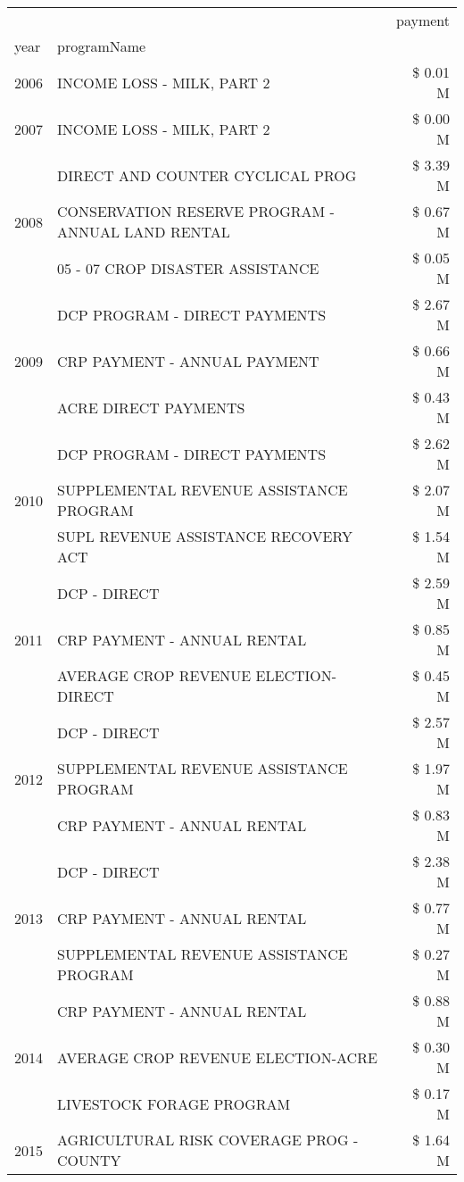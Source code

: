 \begin{tabular}{llr}
\toprule
 &  & payment \\
year & programName &  \\
\midrule
2006 & INCOME LOSS - MILK, PART 2 & \$ 0.01 M \\
\cline{1-3}
2007 & INCOME LOSS - MILK, PART 2 & \$ 0.00 M \\
\cline{1-3}
\multirow[t]{3}{*}{2008} & DIRECT AND COUNTER CYCLICAL PROG & \$ 3.39 M \\
 & CONSERVATION RESERVE PROGRAM - ANNUAL LAND RENTAL & \$ 0.67 M \\
 & 05 - 07 CROP DISASTER ASSISTANCE & \$ 0.05 M \\
\cline{1-3}
\multirow[t]{3}{*}{2009} & DCP PROGRAM - DIRECT PAYMENTS & \$ 2.67 M \\
 & CRP PAYMENT - ANNUAL PAYMENT & \$ 0.66 M \\
 & ACRE DIRECT PAYMENTS & \$ 0.43 M \\
\cline{1-3}
\multirow[t]{3}{*}{2010} & DCP PROGRAM - DIRECT PAYMENTS & \$ 2.62 M \\
 & SUPPLEMENTAL REVENUE ASSISTANCE PROGRAM & \$ 2.07 M \\
 & SUPL REVENUE ASSISTANCE RECOVERY ACT & \$ 1.54 M \\
\cline{1-3}
\multirow[t]{3}{*}{2011} & DCP - DIRECT & \$ 2.59 M \\
 & CRP PAYMENT - ANNUAL RENTAL & \$ 0.85 M \\
 & AVERAGE CROP REVENUE ELECTION-DIRECT & \$ 0.45 M \\
\cline{1-3}
\multirow[t]{3}{*}{2012} & DCP - DIRECT & \$ 2.57 M \\
 & SUPPLEMENTAL REVENUE ASSISTANCE PROGRAM & \$ 1.97 M \\
 & CRP PAYMENT - ANNUAL RENTAL & \$ 0.83 M \\
\cline{1-3}
\multirow[t]{3}{*}{2013} & DCP - DIRECT & \$ 2.38 M \\
 & CRP PAYMENT - ANNUAL RENTAL & \$ 0.77 M \\
 & SUPPLEMENTAL REVENUE ASSISTANCE PROGRAM & \$ 0.27 M \\
\cline{1-3}
\multirow[t]{3}{*}{2014} & CRP PAYMENT - ANNUAL RENTAL & \$ 0.88 M \\
 & AVERAGE CROP REVENUE ELECTION-ACRE & \$ 0.30 M \\
 & LIVESTOCK FORAGE PROGRAM & \$ 0.17 M \\
\cline{1-3}
\multirow[t]{3}{*}{2015} & AGRICULTURAL RISK COVERAGE PROG - COUNTY & \$ 1.64 M \\

\end{tabular}
